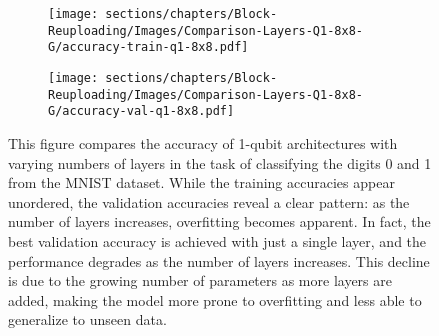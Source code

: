 \begin{figure}[H]
    \centering
    \begin{subfigure}[b]{\textwidth}
        \centering
        \texttt{[image: sections/chapters/Block-Reuploading/Images/Comparison-Layers-Q1-8x8-G/accuracy-train-q1-8x8.pdf]}
    \end{subfigure}
    \begin{subfigure}[b]{\textwidth}
        \centering
        \texttt{[image: sections/chapters/Block-Reuploading/Images/Comparison-Layers-Q1-8x8-G/accuracy-val-q1-8x8.pdf]}
    \end{subfigure}
    \caption{This figure compares the accuracy of 1-qubit architectures with varying numbers of layers in the task 
    of classifying the digits 0 and 1 from the MNIST dataset. While the training accuracies appear unordered, 
    the validation accuracies reveal a clear pattern: as the number of layers increases, overfitting becomes 
    apparent. In fact, the best validation accuracy is achieved with just a single layer, and the performance 
    degrades as the number of layers increases. This decline is due to the growing number of parameters as more 
    layers are added, making the model more prone to overfitting and less able to generalize to unseen data.}
\end{figure}